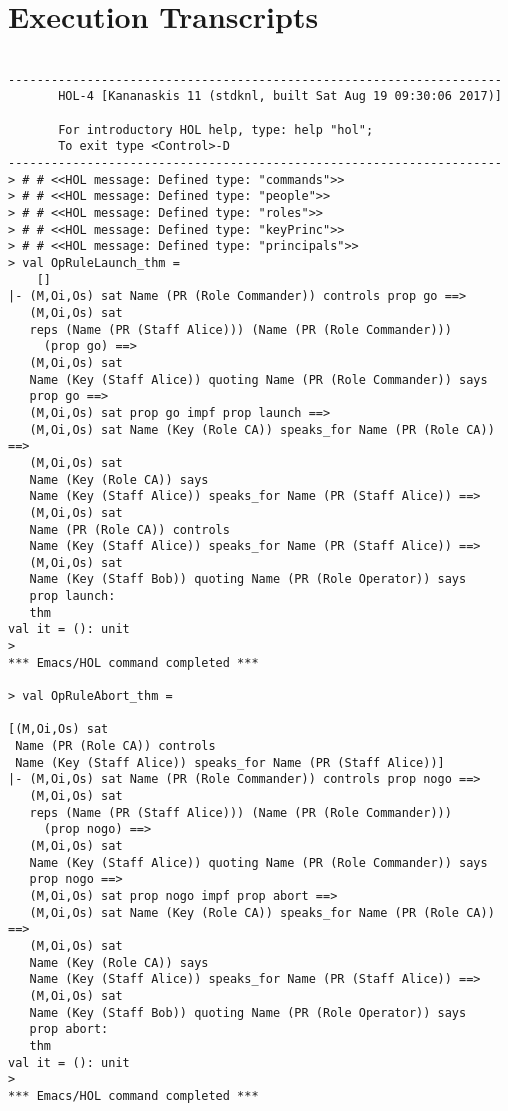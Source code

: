 \documentclass{report}
\begin{document}
\section{Execution Transcripts}
\label{sec:exec-transcr-3}
\setcounter{sessioncount}{0}
\begin{session}
  \begin{scriptsize}
\begin{verbatim}

---------------------------------------------------------------------
       HOL-4 [Kananaskis 11 (stdknl, built Sat Aug 19 09:30:06 2017)]

       For introductory HOL help, type: help "hol";
       To exit type <Control>-D
---------------------------------------------------------------------
> # # <<HOL message: Defined type: "commands">>
> # # <<HOL message: Defined type: "people">>
> # # <<HOL message: Defined type: "roles">>
> # # <<HOL message: Defined type: "keyPrinc">>
> # # <<HOL message: Defined type: "principals">>
> val OpRuleLaunch_thm =
    []
|- (M,Oi,Os) sat Name (PR (Role Commander)) controls prop go ==>
   (M,Oi,Os) sat
   reps (Name (PR (Staff Alice))) (Name (PR (Role Commander)))
     (prop go) ==>
   (M,Oi,Os) sat
   Name (Key (Staff Alice)) quoting Name (PR (Role Commander)) says
   prop go ==>
   (M,Oi,Os) sat prop go impf prop launch ==>
   (M,Oi,Os) sat Name (Key (Role CA)) speaks_for Name (PR (Role CA)) ==>
   (M,Oi,Os) sat
   Name (Key (Role CA)) says
   Name (Key (Staff Alice)) speaks_for Name (PR (Staff Alice)) ==>
   (M,Oi,Os) sat
   Name (PR (Role CA)) controls
   Name (Key (Staff Alice)) speaks_for Name (PR (Staff Alice)) ==>
   (M,Oi,Os) sat
   Name (Key (Staff Bob)) quoting Name (PR (Role Operator)) says
   prop launch:
   thm
val it = (): unit
> 
*** Emacs/HOL command completed ***

> val OpRuleAbort_thm =
   
[(M,Oi,Os) sat
 Name (PR (Role CA)) controls
 Name (Key (Staff Alice)) speaks_for Name (PR (Staff Alice))]
|- (M,Oi,Os) sat Name (PR (Role Commander)) controls prop nogo ==>
   (M,Oi,Os) sat
   reps (Name (PR (Staff Alice))) (Name (PR (Role Commander)))
     (prop nogo) ==>
   (M,Oi,Os) sat
   Name (Key (Staff Alice)) quoting Name (PR (Role Commander)) says
   prop nogo ==>
   (M,Oi,Os) sat prop nogo impf prop abort ==>
   (M,Oi,Os) sat Name (Key (Role CA)) speaks_for Name (PR (Role CA)) ==>
   (M,Oi,Os) sat
   Name (Key (Role CA)) says
   Name (Key (Staff Alice)) speaks_for Name (PR (Staff Alice)) ==>
   (M,Oi,Os) sat
   Name (Key (Staff Bob)) quoting Name (PR (Role Operator)) says
   prop abort:
   thm
val it = (): unit
> 
*** Emacs/HOL command completed ***

\end{verbatim}
  \end{scriptsize}
\end{session}
\end{document}
